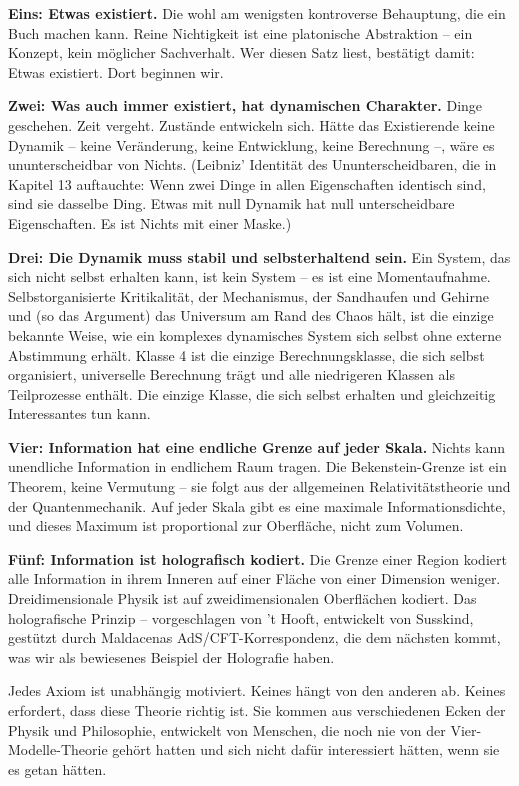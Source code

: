 \documentclass[11pt, twoside, openright]{book}
\begin{document}
\textbf{Eins: Etwas existiert.} Die wohl am wenigsten kontroverse Behauptung, die ein Buch machen kann. Reine Nichtigkeit ist eine platonische Abstraktion -- ein Konzept, kein möglicher Sachverhalt. Wer diesen Satz liest, bestätigt damit: Etwas existiert. Dort beginnen wir.

\textbf{Zwei: Was auch immer existiert, hat dynamischen Charakter.} Dinge geschehen. Zeit vergeht. Zustände entwickeln sich. Hätte das Existierende keine Dynamik -- keine Veränderung, keine Entwicklung, keine Berechnung --, wäre es ununterscheidbar von Nichts. (Leibniz' Identität des Ununterscheidbaren, die in Kapitel 13 auftauchte: Wenn zwei Dinge in allen Eigenschaften identisch sind, sind sie dasselbe Ding. Etwas mit null Dynamik hat null unterscheidbare Eigenschaften. Es ist Nichts mit einer Maske.)

\textbf{Drei: Die Dynamik muss stabil und selbsterhaltend sein.} Ein System, das sich nicht selbst erhalten kann, ist kein System -- es ist eine Momentaufnahme. Selbstorganisierte Kritikalität, der Mechanismus, der Sandhaufen und Gehirne und (so das Argument) das Universum am Rand des Chaos hält, ist die einzige bekannte Weise, wie ein komplexes dynamisches System sich selbst ohne externe Abstimmung erhält. Klasse 4 ist die einzige Berechnungsklasse, die sich selbst organisiert, universelle Berechnung trägt und alle niedrigeren Klassen als Teilprozesse enthält. Die einzige Klasse, die sich selbst erhalten und gleichzeitig Interessantes tun kann.

\textbf{Vier: Information hat eine endliche Grenze auf jeder Skala.} Nichts kann unendliche Information in endlichem Raum tragen. Die Bekenstein-Grenze ist ein Theorem, keine Vermutung -- sie folgt aus der allgemeinen Relativitätstheorie und der Quantenmechanik. Auf jeder Skala gibt es eine maximale Informationsdichte, und dieses Maximum ist proportional zur Oberfläche, nicht zum Volumen.

\textbf{Fünf: Information ist holografisch kodiert.} Die Grenze einer Region kodiert alle Information in ihrem Inneren auf einer Fläche von einer Dimension weniger. Dreidimensionale Physik ist auf zweidimensionalen Oberflächen kodiert. Das holografische Prinzip -- vorgeschlagen von 't Hooft, entwickelt von Susskind, gestützt durch Maldacenas AdS/CFT-Korrespondenz, die dem nächsten kommt, was wir als bewiesenes Beispiel der Holografie haben.

Jedes Axiom ist unabhängig motiviert. Keines hängt von den anderen ab. Keines erfordert, dass diese Theorie richtig ist. Sie kommen aus verschiedenen Ecken der Physik und Philosophie, entwickelt von Menschen, die noch nie von der Vier-Modelle-Theorie gehört hatten und sich nicht dafür interessiert hätten, wenn sie es getan hätten.
\end{document}
